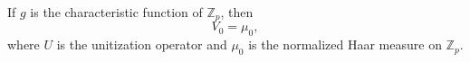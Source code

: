 If $g$ is the characteristic function of $\mathbb{Z}_p$, then
$$V_0 = \mu_0,$$
where $U$ is the unitization operator and $\mu_0$ is the normalized Haar measure on $\mathbb{Z}_p$.
